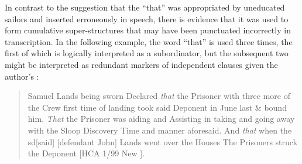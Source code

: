 In contrast to the suggestion that the  “that” was appropriated by uneducated sailors and inserted erroneously in speech, there is evidence that it was used to form cumulative super-structures that may have been punctuated incorrectly in transcription. In the following example, the word “that” is used three times, the first of which is logically interpreted as a subordinator, but the subsequent two might be interpreted as redundant markers of independent clauses given the author’s :

\begin{quotation}
Samuel Lands being sworn Declared \textit{that} the Prisoner with three more of the Crew first time of landing took said Deponent in June last \& bound him. \textit{That} the Prisoner was aiding and Assisting in taking and going away with the Sloop Discovery Time and manner aforesaid. And \textit{that} when the sd[said] [defendant John] Lands went over the Houses The Prisoners struck the Deponent [HCA 1/99 New \citealt{Providence1722}]. 
\end{quotation}

